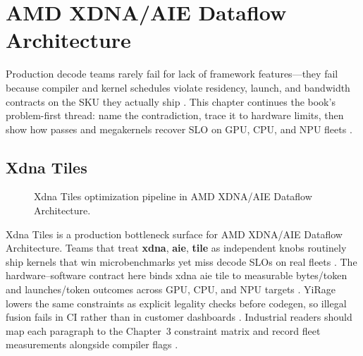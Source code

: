 \chapter{AMD XDNA/AIE Dataflow Architecture}
\label{chap:ch05}

Production decode teams rarely fail for lack of framework features---they fail because compiler and kernel schedules violate residency, launch, and bandwidth contracts on the SKU they actually ship \citep{patel2025llminference,nvidia2022hopper}. This chapter continues the book's problem-first thread: name the contradiction, trace it to hardware limits, then show how passes and megakernels recover SLO on GPU, CPU, and NPU fleets \citep{taxbreak2026,semianalysis2024tma}.

\section{Xdna Tiles}
\label{sec:xdna_tiles}
\begin{figure}[t]
\centering
{}
\caption{Xdna Tiles optimization pipeline in AMD XDNA/AIE Dataflow Architecture.}
\label{fig:xdna_tiles_pipeline}
\end{figure}


Xdna Tiles is a production bottleneck surface for AMD XDNA/AIE Dataflow Architecture. Teams that treat \textbf{xdna}, \textbf{aie}, \textbf{tile} as independent knobs routinely ship kernels that win microbenchmarks yet miss decode SLOs on real fleets \citep{patel2025llminference,nvidia2022hopper}. The hardware--software contract here binds xdna aie tile to measurable bytes/token and launches/token outcomes across GPU, CPU, and NPU targets \citep{taxbreak2026,semianalysis2024tma}. YiRage lowers the same constraints as explicit legality checks before codegen, so illegal fusion fails in CI rather than in customer dashboards \citep{memoryfloor2026,amd2024xdna}. Industrial readers should map each paragraph to the Chapter~3 constraint matrix and record fleet measurements alongside compiler flags \citep{nvidia2022hopper,amd2024aie}.

